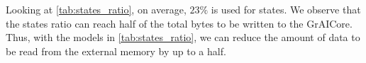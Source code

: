 Looking at \cref{tab:states_ratio}, on average, $23\%$ is used for states.
We observe that the states ratio can reach half of the total bytes to be written to the GrAICore.
Thus, with the models in \cref{tab:states_ratio}, we can reduce the amount of data to be read from the external memory by up to a half.